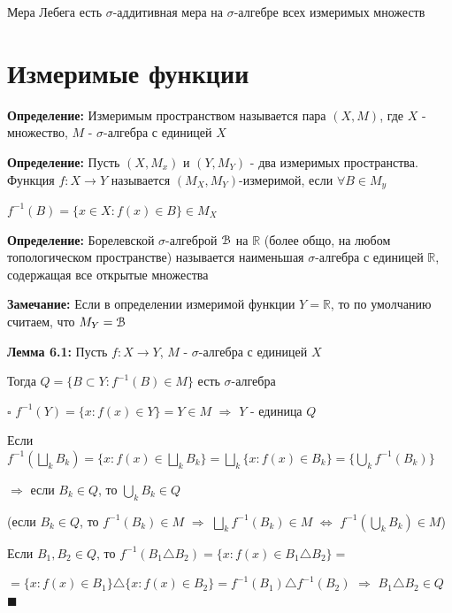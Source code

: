 \documentclass[a4paper]{report}
\begin{document}
Мера Лебега есть $\sigma$-аддитивная мера на $\sigma$-алгебре всех измеримых множеств








\chapter{Измеримые функции}

\noindent\textbf{Определение:} Измеримым пространством называется пара $(X,M)$, где $X$ - множество, $M$ - $\sigma$-алгебра
с единицей $X$
\bigskip

\noindent\textbf{Определение:} Пусть $(X,M_x)$ и $(Y,M_Y)$ - два измеримых пространства. Функция $f\colon X\to Y$ называется
$(M_X,M_Y)$-измеримой, если $\forall B\in M_y$ 

$f^{-1}(B)=\{x\in X\colon f(x)\in B\}\in M_X$
\bigskip

\noindent\textbf{Определение:} Борелевской $\sigma$-алгеброй $\EuScript B$ на $\mathbb R$ (более общо, на любом 
топологическом пространстве) называется наименьшая $\sigma$-алгебра с единицей $\mathbb R$, содержащая все открытые множества
\bigskip

\noindent\textbf{Замечание:} Если в определении измеримой функции $Y=\mathbb R$, то по умолчанию считаем, что $M_Y=\EuScript B$
\bigskip

\noindent\textbf{Лемма 6.1:} Пусть $f\colon X\to Y$, $M$ - $\sigma$-алгебра с единицей $X$

 Тогда $Q=\{B\subset Y\colon f^{-1}(B)\in M\}$ есть $\sigma$-алгебра

\noindent $\square$ $f^{-1}(Y)=\{x\colon f(x)\in Y\}=Y\in M$ $\Rightarrow$ $Y$ - единица $Q$

Если $f^{-1}(\bigsqcup\limits_k B_k)=\{x\colon f(x)\in\bigsqcup\limits_k B_k\}=\bigsqcup\limits_k\{x\colon f(x)\in B_k\}=\{
\bigcup\limits_k f^{-1}(B_k)\}$ 

$\Rightarrow$ если $B_k\in Q$, то $\bigcup\limits_k B_k\in Q$

(если $B_k\in Q$, то $f^{-1}(B_k)\in M$ $\Rightarrow$ $\bigsqcup\limits_k f^{-1}(B_k)\in M$ $\Leftrightarrow$ 
$f^{-1}(\bigcup\limits_k B_k)\in M$)

Если $B_1,B_2\in Q$, то $f^{-1}(B_1\triangle B_2)=\{x\colon f(x)\in B_1\triangle B_2\}=$ 

$=\{x\colon f(x)\in B_1\}\triangle\{x\colon
f(x)\in B_2\}=f^{-1}(B_1)\triangle f^{-1}(B_2)$ $\Rightarrow$ $B_1\triangle B_2\in Q$ $\blacksquare$
\bigskip
\end{document}
